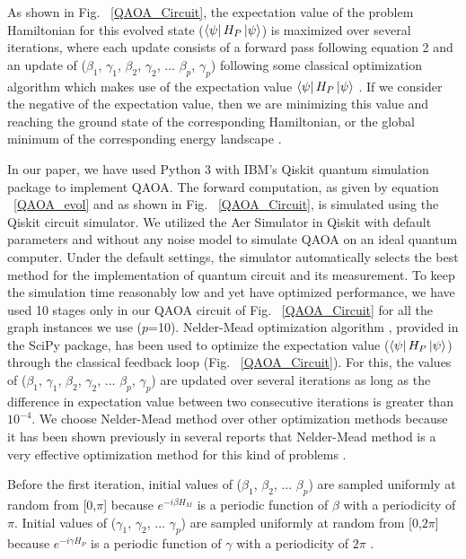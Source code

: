 \documentclass[%
 reprint,
 amsmath,amssymb,
 aps,
]{revtex4-2}
\begin{document}
As shown in Fig. ~\ref{QAOA_Circuit}, the expectation value of the problem Hamiltonian for this evolved state ($\bra{\psi}H_P\ket{\psi}$) is maximized over several iterations, where each update consists of a forward pass following equation 2 and an update  of ($\beta_1$, $\gamma_1$, $\beta_2$, $\gamma_2$, ... $\beta_p$, $\gamma_p$) following some classical optimization algorithm which makes use of the expectation value $\bra{\psi}H_P\ket{\psi}$ \citep{QAOA_Farhi,QAOA_Tutorial}.  If we consider the negative of the expectation value, then we are minimizing this value and reaching the ground state of the corresponding Hamiltonian, or the global minimum of the corresponding energy landscape \citep{IsingComputingReview}.

 

In our paper, we have used Python 3 with IBM's Qiskit quantum simulation package \citep{Qiskit} to implement QAOA. The forward computation, as given by equation ~\ref{QAOA_evol} and as shown in Fig. ~\ref{QAOA_Circuit}, is simulated using the Qiskit circuit simulator. We utilized the Aer Simulator in Qiskit with default parameters and without any noise model to simulate QAOA on an ideal quantum computer. Under the default settings, the simulator automatically selects the best method for the implementation of quantum circuit and its measurement. To keep the simulation time reasonably low and yet have optimized performance, we have used 10 stages only in our QAOA circuit of Fig. ~\ref{QAOA_Circuit} for all the graph instances we use ($p$=10). Nelder-Mead optimization algorithm \citep{NelderMead}, provided in the SciPy package, has been used to optimize the expectation value ($\bra{\psi}H_P\ket{\psi}$) through the classical feedback loop (Fig. ~\ref{QAOA_Circuit}). For this, the values of ($\beta_1$, $\gamma_1$, $\beta_2$, $\gamma_2$, ... $\beta_p$, $\gamma_p$) are updated over several iterations as long as the difference in expectation value between two consecutive iterations is greater than $10^{-4}$. We choose Nelder-Mead method over other optimization methods because it has been shown previously in several reports that Nelder-Mead method \citep{NelderMead} is a very effective optimization method for this kind of problems \citep{QAOA_ErdosRenyi, QuantumAnnealingvsQAOA1,QAOA_NelderMead1,QAOA_NelderMead2}. 


Before the first iteration, initial values of ($\beta_1$, $\beta_2$, ... $\beta_p$) are sampled uniformly at random from [0,$\pi$] because $e^{-i\beta H_M}$ is a periodic function of $\beta$ with a periodicity of $\pi$. Initial values of ($\gamma_1$, $\gamma_2$, ... $\gamma_p$) are sampled uniformly at random from [0,$2\pi$] because $e^{-i\gamma H_P}$ is a periodic function of $\gamma$ with a periodicity of $2\pi$ \citep{QAOA_Farhi,QAOA_ErdosRenyi,QAOA_CompleteGraph,QAOA_NelderMead1,QAOA_NelderMead2}. 
\end{document}
